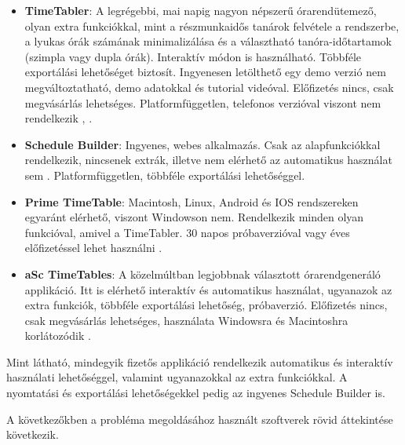\begin{itemize}
	\item \textbf{TimeTabler}: A legrégebbi, mai napig nagyon népszerű órarendütemező, olyan extra funkciókkal,
	mint a részmunkaidős tanárok felvétele a rendszerbe, a lyukas órák számának minimalizálása és a választható
	tanóra-időtartamok (szimpla vagy dupla órák). Interaktív módon is használható. Többféle exportálási lehetőséget biztosít.
	Ingyenesen letölthető egy demo verzió nem megváltoztatható, demo adatokkal és 
	tutorial videóval. Előfizetés nincs, csak megvásárlás lehetséges. 
	Platformfüggetlen, telefonos verzióval viszont nem rendelkezik \cite{coenen1995spatial}, \cite{timetabler}.
	\item \textbf{Schedule Builder}: Ingyenes, webes alkalmazás. Csak az alapfunkciókkal rendelkezik,
	nincsenek extrák, illetve nem elérhető az automatikus használat sem \cite{schedulebuilder}.
	Platformfüggetlen, többféle exportálási lehetőséggel.
	\item \textbf{Prime TimeTable}: Macintosh, Linux, Android és IOS rendszereken egyaránt elérhető, viszont
	Windowson nem. Rendelkezik minden olyan funkcióval, amivel a TimeTabler. 30 napos próbaverzióval vagy éves
	előfizetéssel lehet használni \cite{primetimetable}.
	\item \textbf{aSc TimeTables}: A közelmúltban legjobbnak választott órarendgeneráló applikáció. Itt is elérhető interaktív és
	automatikus használat, ugyanazok az extra funkciók, többféle exportálási lehetőség, próbaverzió. Előfizetés nincs, csak
	megvásárlás lehetséges, használata Windowsra és Macintoshra korlátozódik \cite{asctimetables}.
\end{itemize}

Mint látható, mindegyik fizetős applikáció rendelkezik automatikus és interaktív használati
lehetőséggel, valamint ugyanazokkal az extra funkciókkal. A nyomtatási és exportálási lehetőségekkel
pedig az ingyenes Schedule Builder is. 


A következőkben a probléma megoldásához használt szoftverek rövid áttekintése következik.


